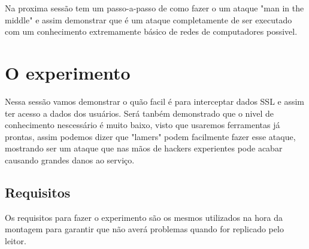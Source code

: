 \documentclass{article}
\begin{document}
    Na proxima sessão tem um passo-a-passo de como fazer o um ataque
  "man in the middle" e assim demonstrar que é um ataque completamente de
  ser executado com um conhecimento extremamente básico de redes de computadores
  possivel.

  \newpage

  \section{O experimento}
    Nessa sessão vamos demonstrar o quão facil é para interceptar dados SSL e
  assim ter acesso a dados dos usuários. Será tanbém demonstrado que o nivel de
  conhecimento nescessário é muito baixo, visto que usaremos ferramentas já prontas,
  assim podemos dizer que "lamers" podem facilmente fazer esse ataque, mostrando
  ser um ataque que nas mãos de hackers experientes pode acabar causando grandes
  danos ao serviço.

  \subsection{Requisitos}
    Os requisitos para fazer o experimento são os mesmos utilizados na hora
  da montagem para garantir que não averá problemas quando for replicado pelo
  leitor.
\end{document}
